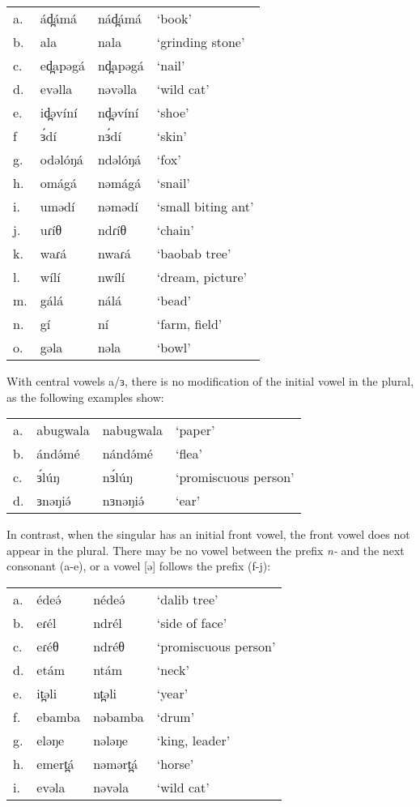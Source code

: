 \ea
\begin{tabular}[t]{llll}
a.	&	ád̪ámá	&	nád̪ámá	&	‘book’\\
b.	&	ala		&	nala		&	‘grinding stone’\\
c.	&	ed̪apəgá	&	nd̪apəgá	&	‘nail’\\
d.	&	evəlla	&	nəvəlla	&	‘wild cat’\\
e.	&	id̪əvíní	&	nd̪əvíní	&	‘shoe’\\
f	&	ɜ́dí		&	nɜ́dí	&	‘skin’\\
g.	&	odəlóŋá	&	ndəlóŋá	&	‘fox’\\
h.	&	omágá	&	nəmágá	&	‘snail’\\
i.	&	umədí	&	nəmədí	&	‘small biting ant’\\
j.	&	uɾíθ	&	ndɾíθ	&	‘chain’\\
k.	&	waɾá	&	nwaɾá	&	‘baobab tree’\\
l.	&	wílí	&	nwílí	&	‘dream, picture’\\
m.	&	gálá	&	nálá		&	‘bead’\\
n.	&	gí		&	ní		&	‘farm, field’\\
o.	&	gəla	&	nəla		&	‘bowl’\\	
\end{tabular}

\z

With central vowels a/ɜ, there is no modification of the initial vowel in the plural, as the following examples show:

\ea	
\begin{tabular}[t]{llll}
a.	&	abugwala	&	nabugwala	&	‘paper’\\
b.	&	ándə́mé		&	nándə́mé		&	‘flea’\\
c.	&	ɜ́lúŋ		&	nɜ́lúŋ		&	‘promiscuous person’\\
d.	&	ɜnəŋiə́		&	nɜnəŋiə́		&	‘ear’\\	
\end{tabular}

\z

In contrast, when the singular has an initial front vowel, the front vowel does not appear in the plural. There may be no vowel between the prefix \textit{n-} and the next consonant (a-e), or a vowel [ə] follows the prefix (f-j):

\ea	
\begin{tabular}[t]{llll}
a.	&	édeə́			&	nédeə́		&	‘dalib tree’\\
b.	&	eɾél		&	ndrél	&	‘side of face’\\
c.	&	eɾéθ		&	ndréθ	&	‘promiscuous person’\\
d.	&	etám		&	ntám		&	‘neck’\\
e.	&	it̪əli		&	nt̪əli	&	‘year’\\
f.	&	ebamba		&	nəbamba	&	‘drum’\\
g.	&	eləŋe		&	nələŋe	&	‘king, leader’\\
h.	&	emert̪á		&	nəmərt̪á	&	‘horse’\\
i.	&	evəla		&	nəvəla	&	‘wild cat’\\	
\end{tabular}
\z


